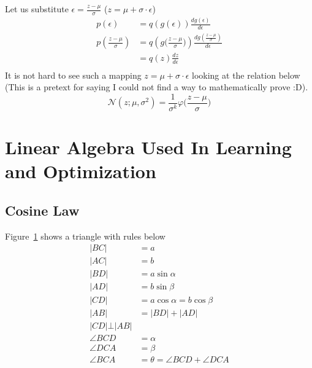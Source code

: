 \documentclass{article}
\numberwithin{equation}{subsection}
\begin{document}
Let us substitute $\epsilon = \frac{z-\mu}{\sigma}$ ($z=\mu+\sigma \cdot \epsilon$)
\begin{align}
    p(\epsilon) &= q(g(\epsilon))\frac{dg(\epsilon)}{d\epsilon}\\ 
    p(\frac{z-\mu}{\sigma}) &= q\left(g\Big(\frac{z-\mu}{\sigma}\Big)\right)\frac{dg(\frac{z-\mu}{\sigma})}{d\epsilon}\\ 
     &= q(z)\frac{dz}{d\epsilon}\\ 
\end{align}
It is not hard to see such a mapping $z=\mu+\sigma \cdot \epsilon$ looking at the relation below (This is a pretext for saying I could not find a way to mathematically prove :D).
\begin{equation}
    \mathcal{N}(z;\mu, \sigma^2) = \frac{1}{\sigma^k}\varphi\Big(\frac{z-\mu}{\sigma}\Big)
\end{equation}
\section{Linear Algebra Used In Learning and Optimization}
\subsection{Cosine Law}
\begin{figure}[H]
    \centering
    \caption{}
    \label{fig:cos_law_tri}
\end{figure}
Figure~\ref{fig:cos_law_tri} shows a triangle with rules below
\begin{align}
    |BC| &= a \\
    |AC| &= b \\
    |BD| &= a\sin\alpha \\   
    |AD| &= b\sin\beta \\
    |CD| &= a\cos\alpha = b\cos\beta\\
    |AB| &= |BD|+|AD|\\
    |CD| \bot |AB|\\
    \angle{BCD} &= \alpha\\
    \angle{DCA} &= \beta \\
    \angle{BCA} &= \theta = \angle{BCD} + \angle{DCA}
\end{align}
\end{document}
